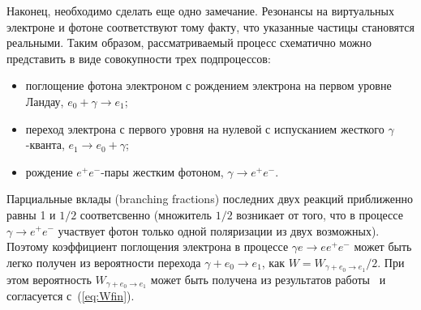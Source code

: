 Наконец, необходимо сделать еще одно замечание.  Резонансы 
на виртуальных электроне и 
фотоне соответствуют тому факту, что указанные частицы становятся 
реальными. Таким образом,  
рассматриваемый процесс схематично можно представить в виде совокупности трех 
подпроцессов: 
\begin{itemize}
\item
поглощение фотона электроном с рождением электрона на первом уровне Ландау, $e_0+\gamma \to e_1$; 

\item
переход электрона с первого уровня на нулевой с испусканием жесткого $\gamma$-кванта, 
$e_1 \to e_0 + \gamma$;

\item
рождение $e^+e^-$-пары жестким фотоном, $\gamma \to e^+e^-$.

\end{itemize}

Парциальные вклады (branching fractions) последних двух 
реакций приближенно равны 1 и $1/2$ соответсвенно 
(множитель $1/2$ возникает от того, 
что в процессе $\gamma \to e^+e^-$ участвует фотон только одной поляризации из двух возможных). 
Поэтому коэффициент поглощения электрона в  процессе  
$\gamma e \to e e^+e^-$ может быть легко получен из 
вероятности перехода $\gamma + e_0  \to e_1$, как $W = W_{\gamma + e_0 \to e_1}/2$. 
При этом вероятность $W_{\gamma + e_0 \to e_1}$ может быть получена из результатов 
работы~\cite{Latal:1986} и согласуется с~(\ref{eq:Wfin}).
 
 